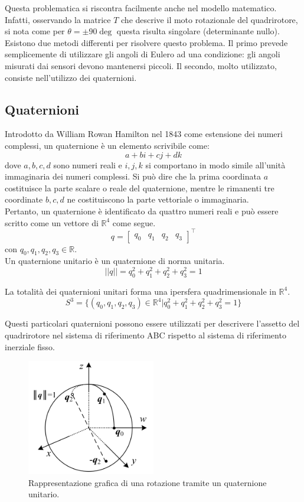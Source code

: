 Questa problematica si riscontra facilmente anche nel modello matematico. Infatti, osservando la matrice $T$ che descrive il moto rotazionale del quadrirotore, si nota come per $\theta = \pm 90 \deg$ questa risulta singolare (determinante nullo).\\

Esistono due metodi differenti per risolvere questo problema. Il primo prevede semplicemente di utilizzare gli angoli di Eulero ad una condizione: gli angoli misurati dai sensori devono mantenersi piccoli. Il secondo, molto utilizzato, consiste nell'utilizzo dei quaternioni.

\subsection{Quaternioni}
Introdotto da William Rowan Hamilton nel 1843 come estensione dei numeri complessi, un quaternione è un elemento scrivibile come:
\[ a + bi + cj + dk \]
dove $a, b, c, d$ sono numeri reali e $i, j, k$ si comportano in modo simile all'unità immaginaria dei numeri complessi. Si può dire che la prima coordinata $a$ costituisce la parte scalare o reale del quaternione, mentre le rimanenti tre coordinate $b, c, d$ ne costituiscono la parte vettoriale o immaginaria.\\

Pertanto, un quaternione è identificato da quattro numeri reali e può essere scritto come un vettore di $\mathbb{R}^4$ come segue.
\[
q = \begin{bmatrix}
q_0 & q_1 & q_2 & q_3
\end{bmatrix}^\top
\]
con $q_0, q_1, q_2, q_3 \in \mathbb{R}$.\\

Un quaternione unitario è un quaternione di norma unitaria.
\[ || q || = q_0^2 + q_1^2 + q_2^2 + q_3^2 = 1 \]

La totalità dei quaternioni unitari forma una ipersfera quadrimensionale in $\mathbb{R}^4$.
\[ S^3 = \{ (q_0, q_1, q_2, q_3) \in \mathbb{R}^4 | q_0^2 + q_1^2 + q_2^2 + q_3^2 = 1\} \]

 Questi particolari quaternioni possono essere utilizzati per descrivere l'assetto del quadrirotore nel sistema di riferimento \acs{ABC} rispetto al sistema di riferimento inerziale fisso.

\begin{figure}[H]
    \centering
    \includegraphics[width=0.5\textwidth]{gfx/quaternion}
    \caption[Rappresentazione grafica di una rotazione tramite un quaternione unitario.]{Rappresentazione grafica di una rotazione tramite un quaternione unitario.}
    \label{fig:quat}
\end{figure}

